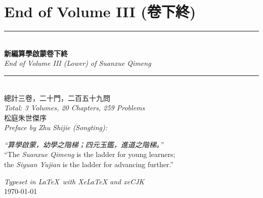 \documentclass[11pt,a4paper]{article}
\newcommand{\longline}{\noindent\rule{\textwidth}{0.4pt}}
\begin{document}
\newpage

\section*{End of Volume III (卷下終)}

\vspace{1cm}

\begin{center}
\longline\\[0.5cm]
{\fontsize{20}{24}\selectfont\bfseries\color{vol3color}
新編算學啟蒙卷下終}\\[0.5cm]
{\large\textit{End of Volume III (Lower) of Suanxue Qimeng}}\\[0.5cm]
\longline\\[1cm]
{\Large 總計三卷，二十門，二百五十九問}\\[0.3cm]
{\large\textit{Total: 3 Volumes, 20 Chapters, 259 Problems}}\\[1cm]
{\large 松庭朱世傑序}\\[0.3cm]
{\normalsize\textit{Preface by Zhu Shijie (Songting):}}\\[0.3cm]
\begin{minipage}{0.8\textwidth}
\centering
\textit{``算學啟蒙，幼學之階梯；四元玉鑑，進道之階梯。''}\\[0.3cm]
``The \textit{Suanxue Qimeng} is the ladder for young learners;\\
the \textit{Siyuan Yujian} is the ladder for advancing further.''
\end{minipage}
\end{center}

\vfill

\begin{center}
{\small\textit{Typeset in \LaTeX\ with \textsf{XeLaTeX} and \textup{xeCJK}}\\
\today}
\end{center}
\end{document}
